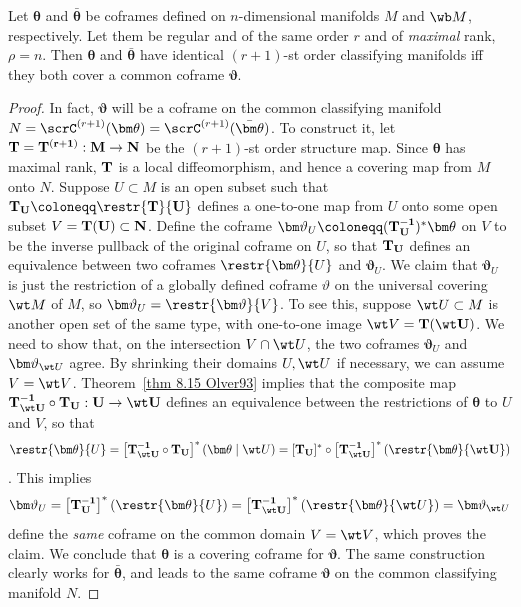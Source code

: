 \begin{thm}
    Let $\bm\theta$ and $\bar{\bm\theta}$ be coframes defined on $n$-dimensional manifolds $M$ and $\wb M$, respectively. Let them be regular and of the same order $r$ and of \emph{maximal} rank, $\rho=n$. Then $\bm\theta$ and $\bar{\bm\theta}$ have identical $(r+1)$-st order classifying manifolds iff they both cover a common coframe $\bm{\vartheta}$.
\end{thm}
\begin{proof}
    In fact, $\bm\vartheta$ will be a coframe on the common classifying manifold $N=\scrC^{(r+1)}(\bm\theta)=\scrC^{(r+1)}(\bar{\bm\theta})$. To construct it, let $\bf{T}=\bf{T}^{(r+1)}:M\to N$ be the $(r+1)$-st order structure map. Since $\bm\theta$ has maximal rank, $\bf{T}$ is a local diffeomorphism, and hence a covering map from $M$ onto $N$. Suppose $U\subset M$ is an open subset such that $\bf{T}_U\coloneqq \restr{\bf{T}}{U}$ defines a one-to-one map from $U$ onto some open subset $V=\bf{T}(U)\subset N$. Define the coframe $\bm\vartheta_U\coloneqq (\bf{T}^{-1}_U)^\ast \bm\theta$ on $V$ to be the inverse pullback of the original coframe on $U$, so that $\bf{T}_U$ defines an equivalence between two coframes $\restr{\bm\theta}{U}$ and $\bm\vartheta_U$. We claim that $\bm\vartheta_U$ is just the restriction of a globally defined coframe $\vartheta$ on the universal covering $\wt M$ of $M$, so $\bm\vartheta_U=\restr{\bm\vartheta}{V}$. To see this, suppose $\wt U\subset M$ is another open set of the same type, with one-to-one image $\wt V=\bf{T}(\wt U)$. We need to show that, on the intersection $V\cap\wt U$, the two coframes $\bm\vartheta_U$ and $\bm\vartheta_{\wt U}$ agree. By shrinking their domains $U,\wt U$ if necessary, we can assume $V=\wt V$. Theorem~\ref{thm 8.15 Olver93} implies that the composite map $\bf{T}_{\wt U}^{-1}\circ \bf{T}_U:U\to \wt U$ defines an equivalence between the restrictions of $\bm\theta$ to $U$ and $V$, so that 
    \[\restr{\bm\theta}{U}=\left[\bf{T}_{\wt U}^{-1}\circ \bf{T}_U\right]^\ast \left(\bm\theta\mid\wt U\right)=[\bf{T}_U]^\ast\circ \left[\bf{T}_{\wt U}^{-1}\right]^\ast \left(\restr{\bm\theta}{\wt U}\right)\].
    This implies 
    \[\bm\vartheta_U=\left[\bf{T}_U^{-1}\right]^\ast\left(\restr{\bm\theta}{U}\right)=\left[\bf{T}^{-1}_{\wt U}\right]^\ast\left(\restr{\bm\theta}{\wt U}\right)=\bm\vartheta_{\wt U}\]
    define the \emph{same} coframe on the common domain $V=\wt V$, which proves the claim. We conclude that $\bm\theta$ is a covering coframe for $\bm\vartheta$. The same construction clearly works for $\bar{\bm\theta}$, and leads to the same coframe $\bm\vartheta$ on the common classifying manifold $N$.
\end{proof}



